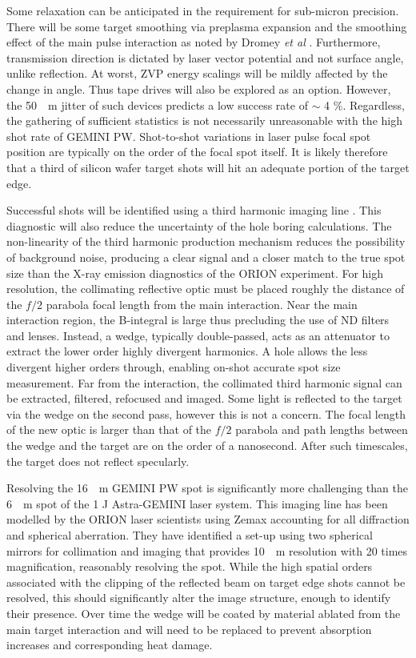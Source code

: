 Some relaxation can be anticipated in the requirement for sub-micron precision. There will be some target smoothing via preplasma expansion and the smoothing effect of the main pulse interaction as noted by Dromey \textit{et al} \cite{dromeyDiffractionlimitedPerformanceFocusing2009}. Furthermore, transmission direction is dictated by laser vector potential and not surface angle, unlike reflection. At worst, ZVP energy scalings will be mildly affected by the change in angle. Thus tape drives will also be explored as an option. However, the \qty{50}{\mu m} jitter of such devices predicts a low success rate of $\sim$ 4 \%. Regardless, the gathering of sufficient statistics is not necessarily unreasonable with the high shot rate of GEMINI PW. Shot-to-shot variations in laser pulse focal spot position are typically on the order of the focal spot itself. It is likely therefore that a third of silicon wafer target shots will hit an adequate portion of the target edge. 

Successful shots will be identified using a third harmonic imaging line \cite{dromeyThirdHarmonicOrder2009}. This diagnostic will also reduce the uncertainty of the hole boring calculations. The non-linearity of the third harmonic production mechanism reduces the possibility of background noise, producing a clear signal and a closer match to the true spot size than the X-ray emission diagnostics of the ORION experiment. For high resolution, the collimating reflective optic must be placed roughly the distance of the $f/2$ parabola focal length from the main interaction. Near the main interaction region, the B-integral is large thus precluding the use of ND filters and lenses. Instead, a wedge, typically double-passed, acts as an attenuator to extract the lower order highly divergent harmonics. A hole allows the less divergent higher orders through, enabling on-shot accurate spot size measurement. Far from the interaction, the collimated third harmonic signal can be extracted, filtered, refocused and imaged. Some light is reflected to the target via the wedge on the second pass, however this is not a concern. The focal length of the new optic is larger than that of the $f/2$ parabola and path lengths between the wedge and the target are on the order of a nanosecond. After such timescales, the target does not reflect specularly. 

Resolving the \qty{16}{\mu m} GEMINI PW spot is significantly more challenging than the \qty{6}{\mu m} spot of the 1 J Astra-GEMINI laser system. This imaging line has been modelled by the ORION laser scientists using Zemax \cite{AnsysZemaxOpticStudio} accounting for all diffraction and spherical aberration. They have identified a set-up using two spherical mirrors for collimation and imaging that provides \qty{10}{\mu m} resolution with 20 times magnification, reasonably resolving the spot. While the high spatial orders associated with the clipping of the reflected beam on target edge shots cannot be resolved, this should significantly alter the image structure, enough to identify their presence. Over time the wedge will be coated by material ablated from the main target interaction and will need to be replaced to prevent absorption increases and corresponding heat damage.

